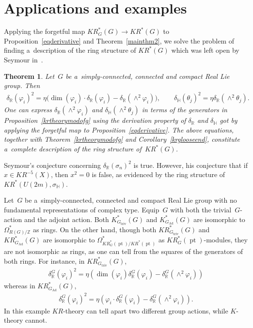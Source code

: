 \documentclass[pdftex]{sigma}
\numberwithin{equation}{section}
\newtheorem{Theorem}{Theorem}[section]
\DeclareMathOperator{\pt}{pt}
\begin{document}
\section{Applications and examples}\label{Section5}

Applying the forgetful map $KR_G^*(G)\to KR^*(G)$ to Proposition~\ref{eqderivative} and Theorem~\ref{mainthm2}, we solve
the problem of f\/inding a~description of the ring structure of $KR^*(G)$ which was left open by Seymour in~\cite{Se}.
\begin{Theorem}
Let~$G$ be a~simply-connected, connected and compact Real Lie group.
Then
\begin{gather*}
\delta_\mathbb{R}(\varphi_i)^2
=\eta\big(\dim(\varphi_i)\cdot\delta_\mathbb{R}(\varphi_i)-\delta_\mathbb{R}(\wedge^2\varphi_i)\big),
\qquad
\delta_\mathbb{H}(\theta_j)^2=\eta\delta_\mathbb{R}(\wedge^2\theta_j).
\end{gather*}
One can express $\delta_\mathbb{R}(\wedge^2\varphi_i)$ and $\delta_\mathbb{H}(\wedge^2\theta_j)$ in terms of the
generators in Proposition~{\rm \ref{krtheorymodofg}} using the derivation property of $\delta_\mathbb{R}$ and
$\delta_\mathbb{H}$ got by applying the forgetful map to Proposition~{\rm \ref{eqderivative}}.
The above equations, together with Theorem~{\rm \ref{krtheorymodofg}} and Corollary~{\rm \ref{krglooseend}}, constitute a~complete
description of the ring structure of~$KR^*(G)$.
\end{Theorem}
\begin{Remark}
Seymour's conjecture concerning $\delta_\mathbb{R}(\sigma_n)^2$ is true.
However, his conjecture that if $x\in KR^{-5}
(X)$, then $x^2=0$ is false, as evidenced by the ring structure of $KR^*(U(2m),
\sigma_{\mathbb{H}})$.
\end{Remark}
\begin{Example}
Let~$G$ be a~simply-connected, connected and compact Real Lie group with no fundamental representations of complex type.
Equip~$G$ with both the trivial~$G$-action and the adjoint action.
Both $K_{G_{\text{triv}}}^*(G)$ and $K_{G_{\text{Ad}}}^*(G)$ are isomorphic to $\Omega^*_{R(G)/\mathbb{Z}}$ as rings.
On the other hand, though both $KR^*_{G_{\text{triv}}}(G)$ and $KR^*_{G_{\text{Ad}}}(G)$ are isomorphic to
$\Omega_{KR^*_G(\pt)/KR^*(\pt)}^*$ as $KR^*_{G}(\pt)$-modules, they are not isomorphic as rings, as
one can tell from the squares of the generators of both rings.
For instance, in $KR_{G_{\text{triv}}}^*(G)$,
\begin{gather*}
\delta^G_\mathbb{R}(\varphi_i)^2
=\eta\left(\dim(\varphi_i)\delta_\mathbb{R}^G(\varphi_i)-\delta_\mathbb{R}^G(\wedge^2\varphi_i)\right)
\end{gather*}
whereas in $KR^*_{G_{\text{Ad}}}(G)$,
\begin{gather*}
\delta_\mathbb{R}^G(\varphi_i)^2
=\eta\left(\varphi_i\cdot\delta_\mathbb{R}^G(\varphi_i)-\delta_\mathbb{R}^G(\wedge^2\varphi_i)\right).
\end{gather*}
In this example $KR$-theory can tell apart two dif\/ferent group actions, while $K$-theory cannot.
\end{Example}
\end{document}
